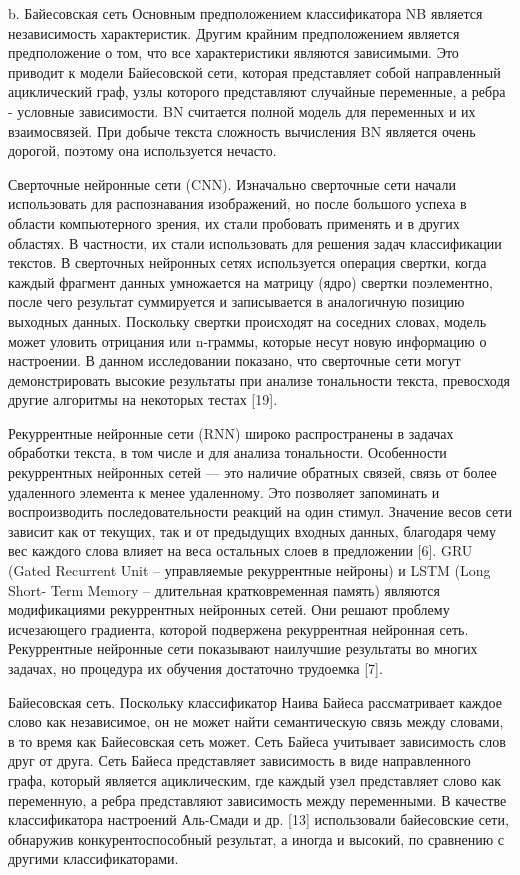 b. Байесовская сеть
Основным предположением классификатора NB является независимость характеристик.
Другим крайним предположением является предположение о том, что все
характеристики являются зависимыми. Это приводит к модели Байесовской сети,
которая представляет собой направленный ациклический граф, узлы которого
представляют случайные переменные, а ребра - условные зависимости. BN считается
полной модель для переменных и их взаимосвязей. При добыче текста сложность
вычисления BN является очень дорогой, поэтому она используется нечасто.
\cite{article4}

Сверточные нейронные сети (CNN). Изначально сверточные сети начали использовать
для распознавания изображений, но после большого успеха в области компьютерного
зрения, их стали пробовать применять и в других областях. В частности, их стали
использовать для решения задач классификации текстов. В сверточных нейронных
сетях используется операция свертки, когда каждый фрагмент данных умножается на
матрицу (ядро) свертки поэлементно, после чего результат суммируется и
записывается в аналогичную позицию выходных данных. Поскольку свертки происходят
на соседних словах, модель может уловить отрицания или n-граммы, которые несут
новую информацию о настроении. В данном исследовании показано, что сверточные
сети могут демонстрировать высокие результаты при анализе тональности текста,
превосходя другие алгоритмы на некоторых тестах [19].~\cite{article9}

Рекуррентные нейронные сети (RNN) широко распространены в задачах обработки
текста, в том числе и для анализа тональности. Особенности рекуррентных
нейронных сетей — это наличие обратных связей, связь от более удаленного
элемента к менее удаленному. Это позволяет запоминать и воспроизводить
последовательности реакций на один стимул. Значение весов сети зависит как от
текущих, так и от предыдущих входных данных, благодаря чему вес каждого слова
влияет на веса остальных слоев в предложении [6].
GRU (Gated Recurrent Unit – управляемые рекуррентные нейроны) и LSTM (Long
Short- Term Memory – длительная кратковременная память) являются модификациями
рекуррентных нейронных сетей. Они решают проблему исчезающего градиента, которой
подвержена рекуррентная нейронная сеть.
Рекуррентные нейронные сети показывают наилучшие результаты во многих задачах,
но процедура их обучения достаточно трудоемка [7].~\cite{article9}

Байесовская сеть. Поскольку классификатор Наива Байеса рассматривает каждое
слово как независимое, он не может найти семантическую связь между словами, в то
время как Байесовская сеть может. Сеть Байеса учитывает зависимость слов друг от
друга. Сеть Байеса представляет зависимость в виде направленного графа, который
является ациклическим, где каждый узел представляет слово как переменную, а
ребра представляют зависимость между переменными. В качестве классификатора
настроений Аль-Смади и др. [13] использовали байесовские сети, обнаружив
конкурентоспособный результат, а иногда и высокий, по сравнению с другими
классификаторами.~\cite{article16}


